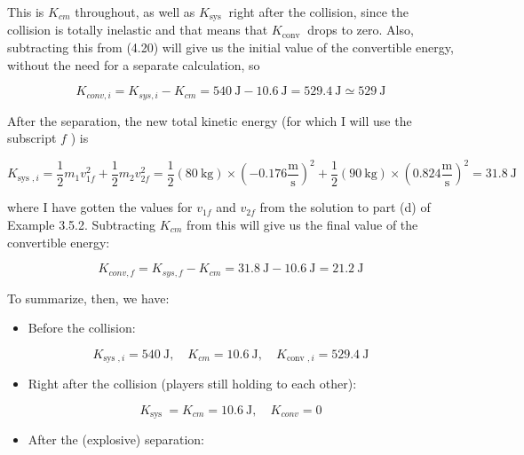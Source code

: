 \documentclass[10pt]{article}
\begin{document}
This is $K_{c m}$ throughout, as well as $K_{\text {sys }}$ right after the collision, since the collision is totally inelastic and that means that $K_{\text {conv }}$ drops to zero. Also, subtracting this from (4.20) will give us the initial value of the convertible energy, without the need for a separate calculation, so


\begin{equation*}
K_{c o n v, i}=K_{s y s, i}-K_{c m}=540 \mathrm{~J}-10.6 \mathrm{~J}=529.4 \mathrm{~J} \simeq 529 \mathrm{~J} \tag{4.22}
\end{equation*}


After the separation, the new total kinetic energy (for which I will use the subscript $f$ ) is


\begin{equation*}
K_{\text {sys }, i}=\frac{1}{2} m_{1} v_{1 f}^{2}+\frac{1}{2} m_{2} v_{2 f}^{2}=\frac{1}{2}(80 \mathrm{~kg}) \times\left(-0.176 \frac{\mathrm{m}}{\mathrm{s}}\right)^{2}+\frac{1}{2}(90 \mathrm{~kg}) \times\left(0.824 \frac{\mathrm{m}}{\mathrm{s}}\right)^{2}=31.8 \mathrm{~J} \tag{4.23}
\end{equation*}


where I have gotten the values for $v_{1 f}$ and $v_{2 f}$ from the solution to part (d) of Example 3.5.2. Subtracting $K_{c m}$ from this will give us the final value of the convertible energy:


\begin{equation*}
K_{c o n v, f}=K_{s y s, f}-K_{c m}=31.8 \mathrm{~J}-10.6 \mathrm{~J}=21.2 \mathrm{~J} \tag{4.24}
\end{equation*}


To summarize, then, we have:

\begin{itemize}
  \item Before the collision:
\end{itemize}

$$
K_{\text {sys }, i}=540 \mathrm{~J}, \quad K_{c m}=10.6 \mathrm{~J}, \quad K_{\text {conv }, i}=529.4 \mathrm{~J}
$$

\begin{itemize}
  \item Right after the collision (players still holding to each other):
\end{itemize}

$$
K_{\text {sys }}=K_{c m}=10.6 \mathrm{~J}, \quad K_{c o n v}=0
$$

\begin{itemize}
  \item After the (explosive) separation:
\end{itemize}
\end{document}
